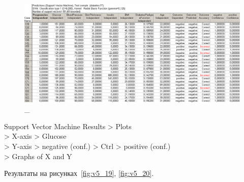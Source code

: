 \begin{figure}[!hp]
  \centering

  \includegraphics[width=14cm]
  {inc/v5_18_2.PNG}

  \caption{\_}

  \label{fig:v5_18_2}
\end{figure}

\newpage

Support Vector Machine Results > Plots \\
> X-axis > Glucose \\
> Y-axis > negative (conf.) > Ctrl > positive (conf.) \\
> Graphs of X and Y

Результаты на рисунках~\ref{fig:v5_19}, \ref{fig:v5_20}.


